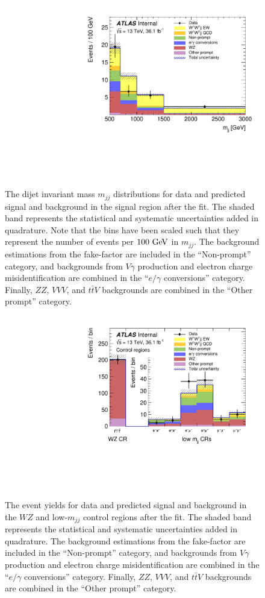 \begin{figure}[htbp]
  \centering
  \includegraphics[width=.6\textwidth]{figs/ssww_13tev/results/mjj_postfit_all}
  \caption{The dijet invariant mass $m_{jj}$ distributions for data and predicted signal and background in the signal region after the fit.  The shaded band represents the statistical and systematic uncertainties added in quadrature.  Note that the bins have been scaled such that they represent the number of events per $100\gev$ in $m_{jj}$.  The background estimations from the fake-factor are included in the ``Non-prompt'' category, and backgrounds from  $V\gamma$ production and electron charge misidentification are combined in the ``$e/\gamma$ conversions'' category.  Finally, $ZZ$, $VVV$, and $t\bar{t}V$ backgrounds are combined in the ``Other prompt'' category.}
  \label{fig:ssww13tev_results_mjj_sr_postfit}
\end{figure}

\begin{figure}[htbp]
  \centering
  \includegraphics[width=.6\textwidth]{figs/ssww_13tev/results/plotCR}
  \caption{The event yields for data and predicted signal and background in the $WZ$ and low-$m_{jj}$ control regions after the fit.  The shaded band represents the statistical and systematic uncertainties added in quadrature.  The background estimations from the fake-factor are included in the ``Non-prompt'' category, and backgrounds from  $V\gamma$ production and electron charge misidentification are combined in the ``$e/\gamma$ conversions'' category.  Finally, $ZZ$, $VVV$, and $t\bar{t}V$ backgrounds are combined in the ``Other prompt'' category.}
  \label{fig:ssww13tev_results_cr_postfit}
\end{figure}

